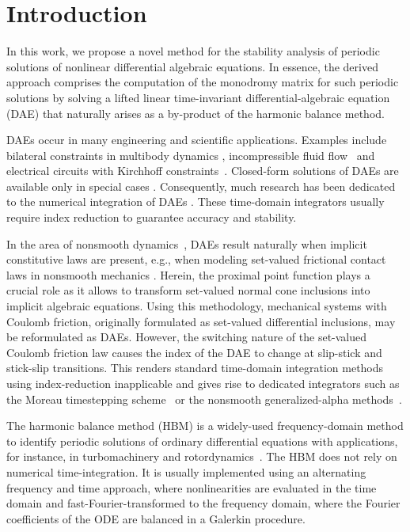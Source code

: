 \documentclass[a4paper, nonatbib, 3p, twocolumn]{elsarticle}
\theoremstyle{plain}
\theoremstyle{definition}
\theoremstyle{remark}
\begin{document}
\section{Introduction}\label{ch:Introduction}
In this work, we propose a novel method for the stability analysis of periodic solutions of nonlinear differential algebraic equations. In essence, the derived approach comprises the computation of the monodromy matrix for such periodic solutions by solving a lifted linear time-invariant differential-algebraic equation (DAE) that naturally arises as a by-product of the harmonic balance method.

DAEs occur in many engineering and scientific applications. Examples include bilateral constraints in multibody dynamics \cite{Roberson1988}, incompressible fluid flow~\cite{Harlow1965, Montlaur2011} and electrical circuits with Kirchhoff constraints~\cite{Gunther1995, Scholz2018}. Closed-form solutions of DAEs are available only in special cases \cite{Campbell1976,Trenn2013}. Consequently, much research has been dedicated to the numerical integration of DAEs \cite{Brenan1995,Gear1985,Anantharaman1991,Trenn2013}. These time-domain integrators usually require index reduction to guarantee accuracy and stability.

In the area of nonsmooth dynamics~\cite{Leine2008,Acary2008}, DAEs result naturally when implicit constitutive laws are present, e.g., when modeling set-valued frictional contact laws in nonsmooth mechanics \cite{Glocker2001}. 
Herein, the proximal point function \cite{Leine2008} plays a crucial role as it allows to transform set-valued normal cone inclusions into implicit algebraic equations. Using this methodology, mechanical systems with Coulomb friction, originally formulated as set-valued differential inclusions, may be reformulated as DAEs. However, the switching nature of the set-valued Coulomb friction law causes the index of the DAE to change at slip-stick and stick-slip transitions. This renders standard time-domain integration methods using index-reduction inapplicable and gives rise to dedicated integrators such as the Moreau timestepping scheme~\cite{Acary2008} or the nonsmooth generalized-alpha methods~\cite{Capobianco2021}.

The harmonic balance method  (HBM) is a widely-used frequency-domain method to identify periodic solutions of ordinary differential equations \cite{Krack2019} with applications, for instance, in turbomachinery and rotordynamics~\cite{VonGroll2001}. The HBM does not rely on numerical time-integration. It is usually implemented using an alternating frequency and time approach, where nonlinearities are evaluated in the time domain and fast-Fourier-transformed to the frequency domain, where the Fourier coefficients of the ODE are balanced in a Galerkin procedure.
\end{document}
